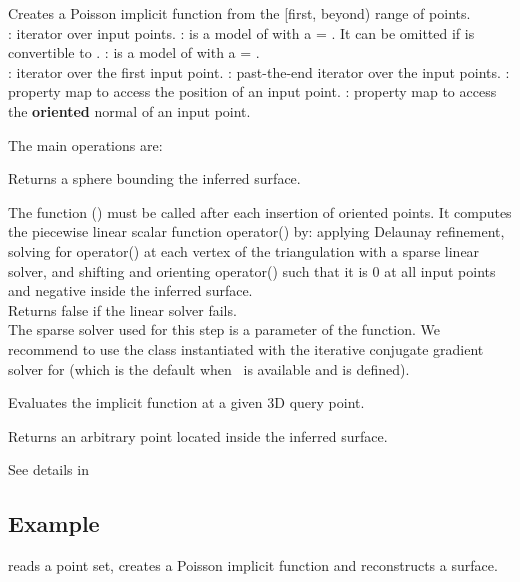 {
Creates a Poisson implicit function from the [first, beyond) range of points.
  \\
: iterator over input points. : is a model of  with a  = . It can be omitted if   is convertible to . : is a model of  with a  = .
  \\
: iterator over the first input point. : past-the-end iterator over the input points. : property map to access the position of an input point. : property map to access the {\bf oriented} normal of an input point.
}

The main operations are:

{
Returns a sphere bounding the inferred surface.
}

{
The function () must be called after each insertion of oriented points. It computes the piecewise linear scalar function operator() by: applying Delaunay refinement, solving for operator() at each vertex of the triangulation with a sparse linear solver, and shifting and orienting operator() such that it is 0 at all input points and negative inside the inferred surface.  \\
Returns false if the linear solver fails.\\
The sparse solver used for this step is a parameter of the function. We recommend to use the class 
instantiated with the iterative conjugate gradient solver  for  (which is the default when \ccThirdPartyEigen\ is available and  is defined).
}

{
Evaluates the implicit function at a given 3D query point.
}

{
Returns an arbitrary point located inside the inferred surface.
}

See details in \\


\subsection{Example}

 reads a point set, creates a Poisson implicit function and reconstructs a surface.



